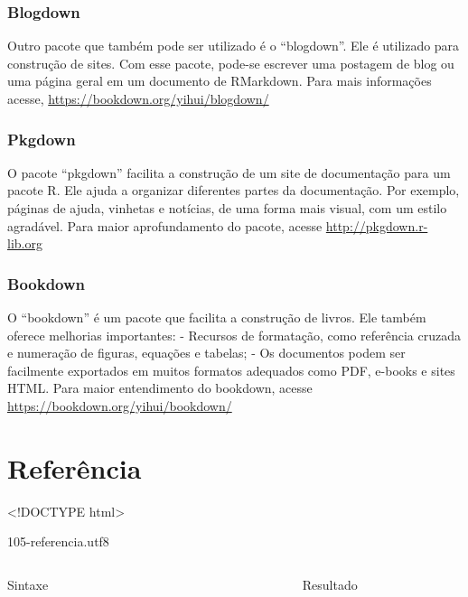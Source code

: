\documentclass[
]{book}
\begin{document}
\hypertarget{blogdown}{%
\subsection{Blogdown}\label{blogdown}}

Outro pacote que também pode ser utilizado é o ``blogdown''.
Ele é utilizado para construção de sites. Com esse pacote, pode-se escrever uma postagem de blog ou uma página geral em um documento de RMarkdown.
Para mais informações acesse, \url{https://bookdown.org/yihui/blogdown/}

\hypertarget{pkgdown}{%
\subsection{Pkgdown}\label{pkgdown}}

O pacote ``pkgdown'' facilita a construção de um site de documentação para um pacote R. Ele ajuda a organizar diferentes partes da documentação.
Por exemplo, páginas de ajuda, vinhetas e notícias, de uma forma mais visual, com um estilo agradável.
Para maior aprofundamento do pacote, acesse \url{http://pkgdown.r-lib.org}

\hypertarget{bookdown}{%
\subsection{Bookdown}\label{bookdown}}

O ``bookdown'' é um pacote que facilita a construção de livros. Ele também oferece melhorias importantes:
- Recursos de formatação, como referência cruzada e numeração de figuras, equações e tabelas;
- Os documentos podem ser facilmente exportados em muitos formatos adequados como PDF, e-books e sites HTML.
Para maior entendimento do bookdown, acesse \url{https://bookdown.org/yihui/bookdown/}

\hypertarget{referuxeancia}{%
\chapter{Referência}\label{referuxeancia}}

\textless!DOCTYPE html\textgreater{}

105-referencia.utf8

\hypertarget{header}{}

\begin{columns}

\begin{column}

Sintaxe

\end{column}

\begin{column}

~

\end{column}

\begin{column}

Resultado

\end{column}

\end{columns}
\end{document}
